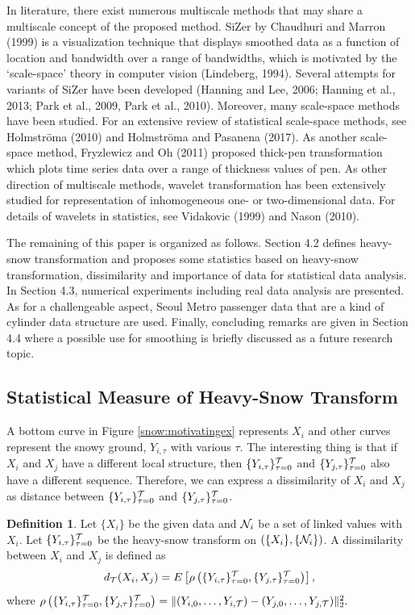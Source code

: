 \documentclass[preprint, review, 12pt]{article}
\theoremstyle{definition}
\newtheorem{dfn}{Definition}
\theoremstyle{remark}
\begin{document}
In literature, there exist numerous multiscale methods that may share a multiscale concept of the proposed method. SiZer by Chaudhuri and Marron (1999) is a visualization technique that displays smoothed data as a function of location and bandwidth over a range of bandwidths, which is motivated by the `scale-space' theory in computer vision (Lindeberg, 1994). Several attempts for variants of SiZer have been developed (Hanning and Lee, 2006; Hanning et al., 2013; Park et al., 2009, Park et al., 2010). Moreover, many scale-space methods have been studied. For an extensive review of statistical scale-space methods, see Holmstr\"oma (2010) and Holmstr\"oma and Pasanena (2017). As another scale-space method, Fryzlewicz and Oh (2011) proposed thick-pen transformation which plots time series data over a range of thickness values of pen. As other direction of multiscale methods, wavelet transformation has been extensively studied for representation of inhomogeneous one- or two-dimensional data. For details of wavelets in statistics, see  Vidakovic (1999) and Nason (2010). 

The remaining of this paper is organized as follows. Section 4.2 defines heavy-snow transformation and proposes some statistics based on heavy-snow transformation, dissimilarity and importance of data for statistical data analysis. In Section 4.3, numerical experiments including real data analysis are presented. As for a challengeable aspect, Seoul Metro passenger data that are a kind of cylinder data structure are used. Finally, concluding remarks are given in Section 4.4 where a possible use for smoothing is briefly discussed as a future research topic. 
\fi 

\iffalse %
\subsection{Statistical Measure of Heavy-Snow Transform}

A bottom curve in Figure \ref{snow:motivatingex} represents $X_i$ and other curves represent the snowy ground, $Y_{i,\tau}$ with various $\tau$. The interesting thing is that if $X_i$ and $X_j$ have a different local structure, then $\{Y_{i,\tau}\}_{\tau=0}^{\cal T}$ and $\{Y_{j,\tau}\}_{\tau=0}^{\cal T}$ also have a different sequence. Therefore, we can express a dissimilarity of $X_i$ and $X_j$ as distance between $\{Y_{i,\tau}\}_{\tau=0}^{\cal T}$ and $\{Y_{j,\tau}\}_{\tau=0}^{\cal T}$.

\begin{dfn}
	Let $\{X_i\}$ be the given data and ${\cal N}_{i}$ be a set of linked values with $X_i$. Let  $\{Y_{i,\tau}\}_{\tau=0}^{\cal T}$ be the heavy-snow transform on $(\{X_i\},\{{\cal N}_i\})$. A dissimilarity between $X_i$ and $X_j$ is defined as
	\[
	d_{\cal T}(X_i,X_j)=E\left[\rho\left(\{Y_{i,\tau}\}_{\tau=0}^{\cal T},\{Y_{j,\tau}\}_{\tau=0}^{\cal T}\right)\right], 
	\]
	where $\rho\left(\{Y_{i,\tau}\}_{\tau=0}^{\cal T},\{Y_{j,\tau}\}_{\tau=0}^{\cal T}\right)=\|(Y_{i,0},\dots,Y_{i,{\cal T}})-(Y_{j,0},\dots,Y_{j,{\cal T}}) \|_2^2.$
\end{dfn}
\end{document}
